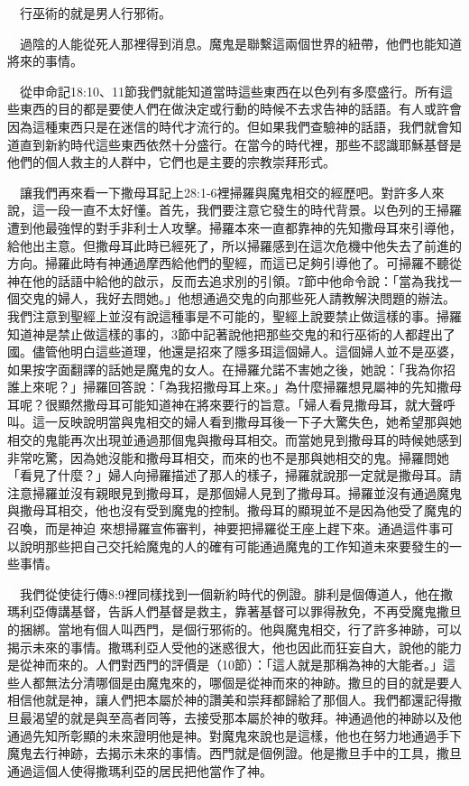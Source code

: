 \documentclass{book}
\begin{document}
　行巫術的就是男人行邪術。

　過陰的人能從死人那裡得到消息。魔鬼是聯繫這兩個世界的紐帶，他們也能知道將來的事情。

　從申命記18:10、11節我們就能知道當時這些東西在以色列有多麼盛行。所有這些東西的目的都是要使人們在做決定或行動的時候不去求告神的話語。有人或許會因為這種東西只是在迷信的時代才流行的。但如果我們查驗神的話語，我們就會知道直到新約時代這些東西依然十分盛行。在當今的時代裡，那些不認識耶穌基督是他們的個人救主的人群中，它們也是主要的宗教崇拜形式。

　讓我們再來看一下撒母耳記上28:1-6裡掃羅與魔鬼相交的經歷吧。對許多人來說，這一段一直不太好懂。首先，我們要注意它發生的時代背景。以色列的王掃羅遭到他最強悍的對手非利士人攻擊。掃羅本來一直都靠神的先知撒母耳來引導他，給他出主意。但撒母耳此時已經死了，所以掃羅感到在這次危機中他失去了前進的方向。掃羅此時有神通過摩西給他們的聖經，而這已足夠引導他了。可掃羅不聽從神在他的話語中給他的啟示，反而去追求別的引領。7節中他命令說：「當為我找一個交鬼的婦人，我好去問她。」他想通過交鬼的向那些死人請教解決問題的辦法。我們注意到聖經上並沒有說這種事是不可能的，聖經上說要禁止做這樣的事。掃羅知道神是禁止做這樣的事的，3節中記著說他把那些交鬼的和行巫術的人都趕出了國。儘管他明白這些道理，他還是招來了隱多珥這個婦人。這個婦人並不是巫婆，如果按字面翻譯的話她是魔鬼的女人。在掃羅允諾不害她之後，她說：「我為你招誰上來呢？」掃羅回答說：「為我招撒母耳上來。」為什麼掃羅想見屬神的先知撒母耳呢？很顯然撒母耳可能知道神在將來要行的旨意。「婦人看見撒母耳，就大聲呼叫。這一反映說明當與鬼相交的婦人看到撒母耳後一下子大驚失色，她希望那與她相交的鬼能再次出現並通過那個鬼與撒母耳相交。而當她見到撒母耳的時候她感到非常吃驚，因為她沒能和撒母耳相交，而來的也不是那與她相交的鬼。掃羅問她「看見了什麼？」婦人向掃羅描述了那人的樣子，掃羅就說那一定就是撒母耳。請注意掃羅並沒有親眼見到撒母耳，是那個婦人見到了撒母耳。掃羅並沒有通過魔鬼與撒母耳相交，他也沒有受到魔鬼的控制。撒母耳的顯現並不是因為他受了魔鬼的召喚，而是神迫 來想掃羅宣佈審判，神要把掃羅從王座上趕下來。通過這件事可以說明那些把自己交托給魔鬼的人的確有可能通過魔鬼的工作知道未來要發生的一些事情。

　我們從使徒行傳8:9裡同樣找到一個新約時代的例證。腓利是個傳道人，他在撒瑪利亞傳講基督，告訴人們基督是救主，靠著基督可以罪得赦免，不再受魔鬼撒旦的捆綁。當地有個人叫西門，是個行邪術的。他與魔鬼相交，行了許多神跡，可以揭示未來的事情。撒瑪利亞人受他的迷惑很大，他也因此而狂妄自大，說他的能力是從神而來的。人們對西門的評價是（10節）：「這人就是那稱為神的大能者。」這些人都無法分清哪個是由魔鬼來的，哪個是從神而來的神跡。撒旦的目的就是要人相信他就是神，讓人們把本屬於神的讚美和崇拜都歸給了那個人。我們都還記得撒旦最渴望的就是與至高者同等，去接受那本屬於神的敬拜。神通過他的神跡以及他通過先知所彰顯的未來證明他是神。對魔鬼來說也是這樣，他也在努力地通過手下魔鬼去行神跡，去揭示未來的事情。西門就是個例證。他是撒旦手中的工具，撒旦通過這個人使得撒瑪利亞的居民把他當作了神。
\end{document}

